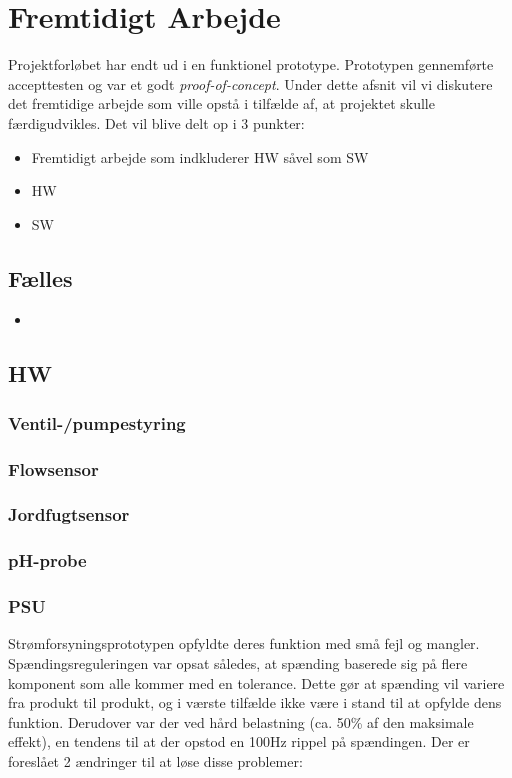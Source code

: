\section{Fremtidigt Arbejde}
Projektforløbet har endt ud i en funktionel prototype. Prototypen gennemførte accepttesten og var et godt \emph{proof-of-concept}. Under dette afsnit vil vi diskutere det fremtidige arbejde som ville opstå i tilfælde af, at projektet skulle færdigudvikles. Det vil blive delt op i 3 punkter:
\begin{itemize}
\item Fremtidigt arbejde som indkluderer HW såvel som SW
\item HW
\item SW
\end{itemize}

\subsection{Fælles}
\begin{itemize}
\item 
\end{itemize}

\subsection{HW}
\subsubsection{Ventil-/pumpestyring}
\subsubsection{Flowsensor}
\subsubsection{Jordfugtsensor}
\subsubsection{pH-probe}
\subsubsection{PSU}
Strømforsyningsprototypen opfyldte deres funktion med små fejl og mangler. Spændingsreguleringen var opsat således, at spænding baserede sig på flere komponent som alle kommer med en tolerance. Dette gør at spænding vil variere fra produkt til produkt, og i værste tilfælde ikke være i stand til at opfylde dens funktion. Derudover var der ved hård belastning (ca. 50\% af den maksimale effekt), en tendens til at der opstod en 100Hz rippel på spændingen. Der er foreslået 2 ændringer til at løse disse problemer:

